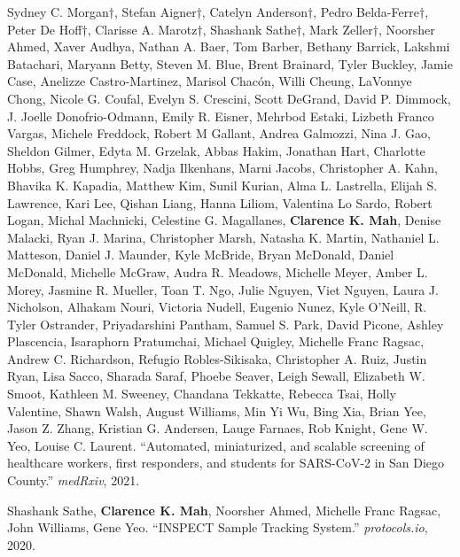 \documentclass[11pt]{formatting-template}
\begin{document}
\begin{vita}
\noindent Sydney C. Morgan$\dagger$, Stefan Aigner$\dagger$, Catelyn Anderson$\dagger$, Pedro Belda-Ferre$\dagger$, Peter De Hoff$\dagger$, Clarisse A. Marotz$\dagger$, Shashank Sathe$\dagger$, Mark Zeller$\dagger$, Noorsher Ahmed, Xaver Audhya, Nathan A. Baer, Tom Barber, Bethany Barrick, Lakshmi Batachari, Maryann Betty, Steven M. Blue, Brent Brainard, Tyler Buckley, Jamie Case, Anelizze Castro-Martinez, Marisol Chacón, Willi Cheung, LaVonnye Chong, Nicole G. Coufal, Evelyn S. Crescini, Scott DeGrand, David P. Dimmock, J. Joelle Donofrio-Odmann, Emily R. Eisner, Mehrbod Estaki, Lizbeth Franco Vargas, Michele Freddock, Robert M Gallant, Andrea Galmozzi, Nina J. Gao, Sheldon Gilmer, Edyta M. Grzelak, Abbas Hakim, Jonathan Hart, Charlotte Hobbs, Greg Humphrey, Nadja Ilkenhans, Marni Jacobs, Christopher A. Kahn, Bhavika K. Kapadia, Matthew Kim, Sunil Kurian, Alma L. Lastrella, Elijah S. Lawrence, Kari Lee, Qishan Liang, Hanna Liliom, Valentina Lo Sardo, Robert Logan, Michal Machnicki, Celestine G. Magallanes, \textbf{Clarence K. Mah}, Denise Malacki, Ryan J. Marina, Christopher Marsh, Natasha K. Martin, Nathaniel L. Matteson, Daniel J. Maunder, Kyle McBride, Bryan McDonald, Daniel McDonald, Michelle McGraw, Audra R. Meadows, Michelle Meyer, Amber L. Morey, Jasmine R. Mueller, Toan T. Ngo, Julie Nguyen, Viet Nguyen, Laura J. Nicholson, Alhakam Nouri, Victoria Nudell, Eugenio Nunez, Kyle O’Neill, R. Tyler Ostrander, Priyadarshini Pantham, Samuel S. Park, David Picone, Ashley Plascencia, Isaraphorn Pratumchai, Michael Quigley, Michelle Franc Ragsac, Andrew C. Richardson, Refugio Robles-Sikisaka, Christopher A. Ruiz, Justin Ryan, Lisa Sacco, Sharada Saraf, Phoebe Seaver, Leigh Sewall, Elizabeth W. Smoot, Kathleen M. Sweeney, Chandana Tekkatte, Rebecca Tsai, Holly Valentine, Shawn Walsh, August Williams, Min Yi Wu, Bing Xia, Brian Yee, Jason Z. Zhang, Kristian G. Andersen, Lauge Farnaes, Rob Knight, Gene W. Yeo, Louise C. Laurent. ``Automated, miniaturized, and scalable screening of healthcare workers, first responders, and students for SARS-CoV-2 in San Diego County.'' \textit{medRxiv}, 2021. \newline

\noindent Shashank Sathe, \textbf{Clarence K. Mah}, Noorsher Ahmed, Michelle Franc Ragsac, John Williams, Gene Yeo. ``INSPECT Sample Tracking System.'' \textit {protocols.io}, 2020. \newline


\end{vita}
\end{document}
